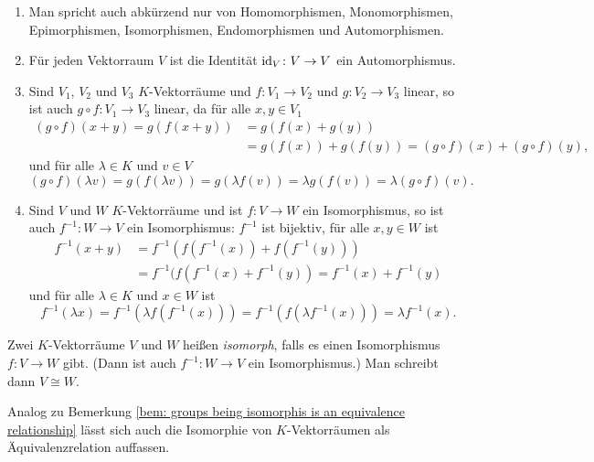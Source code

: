 \begin{bem}
 \begin{enumerate}[leftmargin=*]
  \item
   Man spricht auch abkürzend nur von Homomorphismen, Monomorphismen, Epimorphismen, Isomorphismen, Endomorphismen und Automorphismen.
  \item
   Für jeden Vektorraum $V$ ist die Identität $\mathrm{id}_V \colon V \to V$ ein Automorphismus.
  \item
   Sind $V_1$, $V_2$ und $V_3$ $K$-Vektorräume und $f \colon V_1 \to V_2$ und $g \colon V_2 \to V_3$ linear, so ist auch $g \circ f \colon V_1 \to V_3$ linear, da für alle $x,y \in V_1$
   \begin{align*}
    (g \circ f)(x+y)
    = g(f(x+y))
    &= g(f(x)+g(y)) \\
    &= g(f(x)) + g(f(y))
    = (g \circ f)(x) + (g \circ f)(y),
   \end{align*}
   und für alle $\lambda \in K$ und $v \in V$
   \[
    (g \circ f)(\lambda v)
    = g(f(\lambda v))
    = g(\lambda f(v))
    = \lambda g(f(v))
    = \lambda (g \circ f)(v).
   \]
  \item
   Sind $V$ und $W$ $K$-Vektorräume und ist $f \colon V \to W$ ein Isomorphismus, so ist auch $f^{-1} \colon W \to V$ ein Isomorphismus: $f^{-1}$ ist bijektiv, für alle $x,y \in W$ ist
   \begin{align*}
    f^{-1}(x+y)
    &= f^{-1}( f(f^{-1}(x)) + f(f^{-1}(y)) ) \\
    &= f^{-1}(f( f^{-1}(x) + f^{-1}(y) )
    = f^{-1}(x) + f^{-1}(y)
   \end{align*}
   und für alle $\lambda \in K$ und $x \in W$ ist
   \[
    f^{-1}(\lambda x)
    = f^{-1}(\lambda f(f^{-1}(x)) )
    = f^{-1}(f( \lambda f^{-1}(x)))
    = \lambda f^{-1}(x).
   \]
 \end{enumerate}
\end{bem}


\begin{defi}
 Zwei $K$-Vektorräume $V$ und $W$ heißen \emph{isomorph}, falls es einen Isomorphismus $f \colon V \to W$ gibt. (Dann ist auch $f^{-1} \colon W \to V$ ein Isomorphismus.) Man schreibt dann $V \cong W$.
\end{defi}


\begin{bem}
 Analog zu Bemerkung \ref{bem: groups being isomorphis is an equivalence relationship} lässt sich auch die Isomorphie von $K$-Vektorräumen als Äquivalenzrelation auffassen.
\end{bem}







